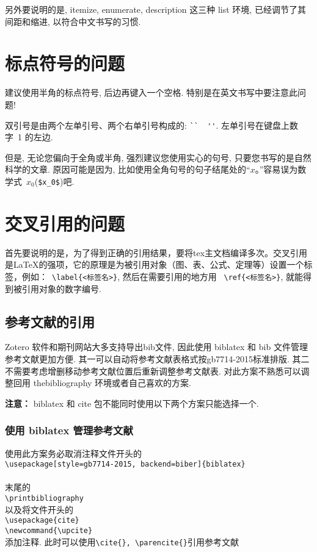 另外要说明的是,  itemize, enumerate, description 这三种 list 环境, 已经调节了其间距和缩进,
以符合中文书写的习惯.

\section{标点符号的问题}

建议使用半角的标点符号, 后边再键入一个空格. 特别是在英文书写中要注意此问题!

双引号是由两个左单引号、两个右单引号构成的: \verb|``  ''|. 左单引号在键盘上数字~1 的左边.

但是, 无论您偏向于全角或半角, 强烈建议您使用实心的句号, 只要您书写的是自然科学的文章.
原因可能是因为, 比如使用全角句号的句子结尾处的``$x$。''容易误为数学式~$x_0$(\verb|$x_0$|)吧.

\section{交叉引用的问题}

首先要说明的是，为了得到正确的引用结果，要将tex主文档编译多次。交叉引用是\LaTeX 的强项，它的原理是为被引用对象（图、表、公式、定理等）设置一个标签，例如：~\verb|\label{<标签名>}|, 然后在需要引用的地方用 ~\verb|\ref{<标签名>}|, 就能得到被引用对象的数字编号.
\subsection{参考文献的引用}
Zotero 软件和期刊网站大多支持导出bib文件, 因此使用 biblatex 和 bib 文件管理参考文献更加方便. 其一可以自动将参考文献表格式按gb7714-2015标准排版. 其二不需要考虑增删移动参考文献位置后重新调整参考文献表. 对此方案不熟悉可以调整回用 {thebibliography} 环境或者自己喜欢的方案.

{\bfseries 注意：} biblatex 和 cite 包不能同时使用以下两个方案只能选择一个.

\subsubsection{使用 biblatex 管理参考文献}
使用此方案务必取消注释文件开头的\\
\verb|\usepackage[style=gb7714-2015, backend=biber]{biblatex}|\\
\verb||\\
末尾的\\
\verb|\printbibliography|\\
以及将文件开头的\\
\verb|\usepackage{cite}|\\
\verb|\newcommand{\upcite}|\\
添加注释. 此时可以使用\verb|\cite{}, \parencite{}|引用参考文献

